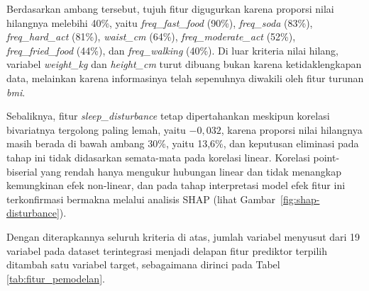 Berdasarkan ambang tersebut, tujuh fitur digugurkan karena proporsi nilai hilangnya melebihi 40\%, yaitu \textit{freq\_fast\_food} (90\%), \textit{freq\_soda} (83\%), \textit{freq\_hard\_act} (81\%), \textit{waist\_cm} (64\%), \textit{freq\_moderate\_act} (52\%), \textit{freq\_fried\_food} (44\%), dan \textit{freq\_walking} (40\%). Di luar kriteria nilai hilang, variabel \textit{weight\_kg} dan \textit{height\_cm} turut dibuang bukan karena ketidaklengkapan data, melainkan karena informasinya telah sepenuhnya diwakili oleh fitur turunan \textit{bmi}.

Sebaliknya, fitur \textit{sleep\_disturbance} tetap dipertahankan meskipun korelasi bivariatnya tergolong paling lemah, yaitu $-0{,}032$, karena proporsi nilai hilangnya masih berada di bawah ambang 30\%, yaitu 13,6\%, dan keputusan eliminasi pada tahap ini tidak didasarkan semata-mata pada korelasi linear. Korelasi point-biserial yang rendah hanya mengukur hubungan linear dan tidak menangkap kemungkinan efek non-linear, dan pada tahap interpretasi model efek fitur ini terkonfirmasi bermakna melalui analisis SHAP (lihat Gambar~\ref{fig:shap-disturbance}).

Dengan diterapkannya seluruh kriteria di atas, jumlah variabel menyusut dari 19 variabel pada dataset terintegrasi menjadi delapan fitur prediktor terpilih ditambah satu variabel target, sebagaimana dirinci pada Tabel \ref{tab:fitur_pemodelan}.

